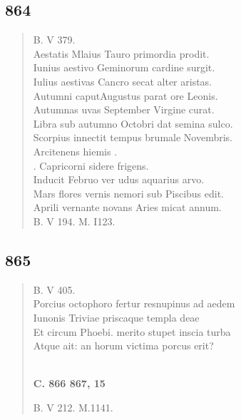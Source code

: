 \documentclass[11pt, a4paper]{report}
\begin{document}
            \subsection*{864}
      \begin{verse}
      B. V 379. \\ Aestatis Mlaius Tauro primordia prodit. \\ Iunius aestivo Geminorum cardine surgit. \\ Iulius aestivas Cancro secat alter aristas. \\ Autumni caputAugustus parat ore Leonis. \\ Autumnas uvas September Virgine curat. \\ Libra sub autumno Octobri dat semina sulco. \\ Scorpius innectit tempus brumale Novembris. \\ Arcitenens hiemis . \\ . Capricorni sidere frigens. \\ Inducit Februo ver udus aquarius arvo. \\ Mars flores vernis nemori sub Piscibus edit. \\ Aprili vernante novans Aries micat annum. \\ B. V 194. M. I123. \\ 
      \end{verse}
  
            \subsection*{865}
      \begin{verse}
      B. V 405. \\ Porcius octophoro fertur resnupinus ad aedem \\ Iunonis Triviae priscaque templa deae \\ Et circum Phoebi. merito stupet inscia turba \\ Atque ait: an horum victima porcus erit? \\ 
        ﻿\pagebreak 
    \begin{center} \textbf{C. 866 867, 15} \end{center} \marginpar{[316]} B. V 212. M.1141. \\ 
      \end{verse}
  
\end{document}
